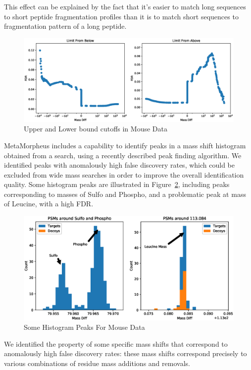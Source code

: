 \documentclass[journal=jprobs,manuscript=article]{achemso}
\begin{document}
This effect can be explained by the fact that it's easier to match long sequences to short peptide fragmentation profiles than it is to match short sequences to fragmentation pattern of a long peptide.

\begin{figure}
\caption{Upper and Lower bound cutoffs in Mouse Data}
\label{fig:figure2-upperlowerbounds}
\includegraphics[scale=0.5]{figure_2-upperlowerbounds}
\end{figure}

MetaMorpheus includes a capability to identify peaks in a mass shift histogram obtained from a search, using a recently described peak finding algorithm\cite{Rodriguez_2014}.
We identified peaks with anomalously high false discovery rates, which could be excluded from wide mass searches in order to improve the overall identification quality.
Some histogram peaks are illustrated in Figure~\ref{fig:figure3}, including peaks corresponding to masses of Sulfo and Phospho, and a problematic peak at mass of Leucine, with a high FDR.

\begin{figure}
\caption{Some Histogram Peaks For Mouse Data}
\label{fig:figure3}
\includegraphics[scale=0.6]{figure_3peaks}
\end{figure}

We identified the property of some specific mass shifts that correspond to anomalously high false discovery rates: these mass shifts correspond precisely to various combinations of residue mass additions and removals.
\end{document}
